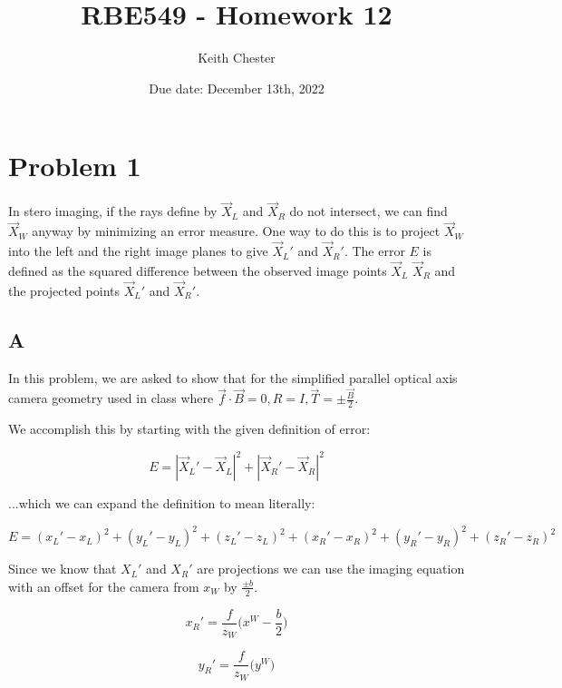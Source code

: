 \documentclass{article}
\title{RBE549 - Homework 12}
\author{Keith Chester}
\date{Due date: December 13th, 2022}
\begin{document}
\maketitle

\section*{Problem 1}
In stero imaging, if the rays define by $\vec{X}_L$ and $\vec{X}_R$ do not intersect, we can find $\vec{X}_W$ anyway by minimizing an error measure. One way to do this is to project $\vec{X}_W$ into the left and the right image planes to give $\vec{X}_L'$ and $\vec{X}_R'$. The error $E$ is defined as the squared difference between the observed image points $\vec{X}_L$ $\vec{X}_R$ and the projected points $\vec{X}_L'$ and $\vec{X}_R'$.

\subsection*{A}

In this problem, we are asked to show that for the simplified parallel optical axis camera geometry used in class where $\vec{f} \cdot \vec{B} = 0, R=I,\vec{T}=\pm\frac{\vec{B}}{2}$.

\noindent We accomplish this by starting with the given definition of error:

\begin{equation}
    E = |\vec{X}_L'-\vec{X}_L|^2 + |\vec{X}_R' - \vec{X}_R|^2
\end{equation}

\noindent ...which we can expand the definition to mean literally:

\begin{equation}
    E = (x_L' - x_L)^2 + (y_L' - y_L)^2 + (z_L' - z_L)^2 + (x_R' - x_R)^2 + (y_R' - y_R)^2 + (z_R' - z_R)^2
\end{equation}

\noindent Since we know that $X_L'$ and $X_R'$ are projections we can use the imaging equation with an offset for the camera from $x_W$ by $\frac{\pm b}{2}$.

\begin{equation}
    x_R'=\frac{f}{z_W}\bigl( x^W - \frac{b}{2} \bigr)
\end{equation}

\begin{equation}
    y_R' = \frac{f}{z_W}\bigl( y^W \bigr)
\end{equation}
\end{document}

